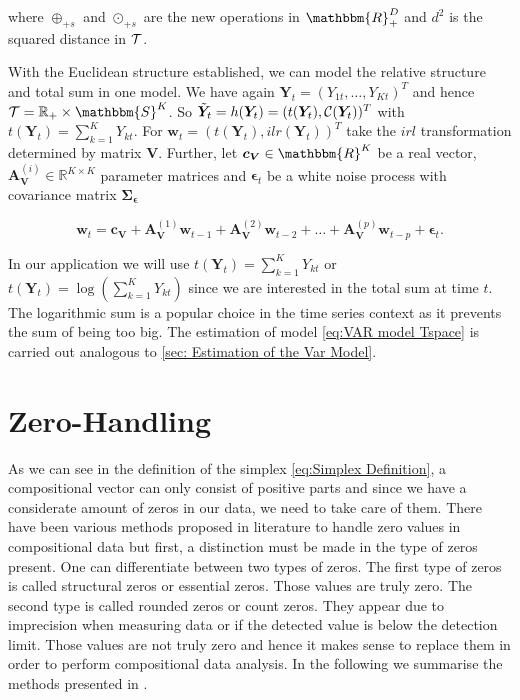 where $\oplus_{+s}$ and $\odot_{+s}$ are the new operations in $\mathbbm{R}_+^D$ and $d^2$ is the squared distance in $\mathcal{T}$. 

With the Euclidean structure established, we can model the relative structure and total sum in one model.  We have again $\bm{Y}_t=(Y_{1t},\ldots,Y_{Kt})^T$ and hence $\Tsp = \mathbb{R}_+ \times \mathbbm{S}^K$. So $\tilde{\bm{Y}}_t=h(\bm{Y}_t)=(t(\bm{Y}_t),\mathcal{C}(\bm{Y}_t))^T$ with $t(\bm{Y}_t)=\sum_{k=1}^K Y_{kt}$. For $\bm{w}_t =(t(\bm{Y}_t),ilr(\bm{Y}_t))^T$ take the $irl$ transformation determined by matrix $\bm{V}$. Further, let $\bm{c}_{\bm{V}} \in \mathbbm{R}^K$ be a real vector, $\textbf{A}_{\textbf{V}}^{(i)} \in \mathbb{R}^{K \times K}$ parameter matrices and $\bm{\epsilon}_t$ be a white noise process with covariance matrix $\bm{\Sigma_\epsilon}$

\begin{equation}
\textbf{w}_t = \textbf{c}_{\textbf{V}} + \textbf{A}_{\textbf{V}}^{(1)}\textbf{w}_{t-1} + \textbf{A}_{\textbf{V}}^{(2)}\textbf{w}_{t-2} + \ldots + \textbf{A}_{\textbf{V}}^{(p)}\textbf{w}_{t-p} + \bm{\epsilon}_{t}.
\label{eq:VAR model Tspace}
\end{equation}

In our application we will use $t(\bm{Y}_t)=\sum_{k=1}^K Y_{kt}$ or $t(\bm{Y}_t)=\log(\sum_{k=1}^K Y_{kt})$ since we are interested in the total sum at time $t$. The logarithmic sum is a popular choice in the time series context as it prevents the sum of being too big\cite{Kynclova:2015}. The estimation of model \ref{eq:VAR model Tspace} is carried out analogous to \ref{sec: Estimation of the Var Model}. 

\section{Zero-Handling}
\label{sec: Zero-Handling}

As we can see in the definition of the simplex \ref{eq:Simplex Definition}, a compositional vector can only consist of positive parts and since we have a considerate amount of zeros in our data, we need to take care of them. There have been various methods proposed in literature to handle zero values in compositional data but first, a distinction must be made in the type of zeros present. One can differentiate between two types of zeros. The first type of zeros is called structural zeros or essential zeros. Those values are truly zero. The second type is called rounded zeros or count zeros. They appear due to imprecision when measuring data or if the detected value is below the detection limit. Those values are not truly zero and hence it makes sense to replace them in order to perform compositional data analysis. In the following we summarise the methods presented in \cite{Lubbe:2021,Josep:2003}. 

